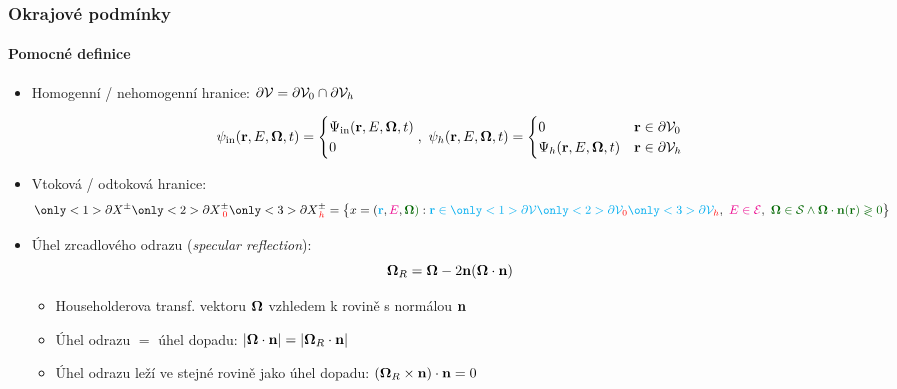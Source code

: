 \begin{frame}
  \frametitle{Okrajové podmínky}
  \framesubtitle{Pomocné definice}
  
  \begin{itemize}
  	\item Homogenní / nehomogenní hranice: $\partial \mathcal{V} = \partial \mathcal{V}_{0} \cap \partial \mathcal{V}_h$
  	\hspace*{-3em}
  	\begin{minipage}{\paperwidth}
    $$
      \psi_{\mathrm{in}}(\mathbf{r},E,\mathbf{\Omega},t) = \begin{cases}
      \Psi_{\mathrm{in}}(\mathbf{r},E,\mathbf{\Omega},t)\\
      0
      \end{cases}\hspace{-1em},\
      \psi_h(\mathbf{r},E,\mathbf{\Omega},t) = \begin{cases}
      0 & \mathbf{r}\in\partial \mathcal{V}_{0}\\
      \Psi_h(\mathbf{r},E,\mathbf{\Omega},t) & \mathbf{r}\in\partial \mathcal{V}_h
      \end{cases}
    $$
    \end{minipage}\vspace{.75em}
    \item Vtoková / odtoková hranice:
  	$$
      \only<1>{\pX[\pm]}\only<2>{\pX[\pm]_{\;\color{red}0}}\only<3>{\pX[\pm]_{\,\color{red}h}} = 
        \bigl\{
          x = ({\color{cyan}\br}, {\color{magenta}E}, {\color{dkgreen}\bomega)}:
          {\color{cyan}\br \in \only<1>{\pV}\only<2>{\pV_{\color{red}0}}\only<3>{\pV_{\color{red}h}}},\ 
          {\color{magenta} E \in \EE},\ 
          {\color{dkgreen}\bomega\in\SS\land\bomega\cdot\bn(\br) \gtrless 0}
        \bigr\}
    $$
    \item Úhel zrcadlového odrazu (\emph{specular reflection}):
    \shorten{-.1em}{-1.5em}
    $$
      \mathbf{\Omega}_R = \mathbf{\Omega} - 2 \mathbf{n} (\mathbf{\Omega} \cdot \mathbf{n})
    $$
    \lengthen
    \begin{itemize}
    	\item Householderova transf. vektoru $\mathbf{\Omega}$ vzhledem k rovině s normálou $\mathbf{n}$
    	\item Úhel odrazu $=$ úhel dopadu:  $\left\vert\mathbf{\Omega}\cdot\mathbf{n}\right\vert = \left\vert\mathbf{\Omega}_R\cdot\mathbf{n}\right\vert$
    	\item Úhel odrazu leží ve stejné rovině jako úhel dopadu: $(\mathbf{\Omega}_R\times\mathbf{n})\cdot\mathbf{n} = 0$
    \end{itemize}
    
  \end{itemize}

\end{frame}

